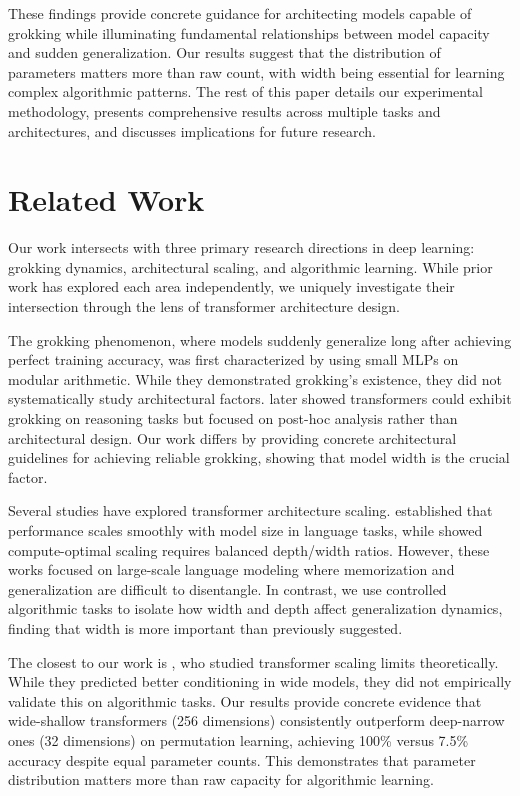 \documentclass{article} %
\begin{document}
These findings provide concrete guidance for architecting models capable of grokking while illuminating fundamental relationships between model capacity and sudden generalization. Our results suggest that the distribution of parameters matters more than raw count, with width being essential for learning complex algorithmic patterns. The rest of this paper details our experimental methodology, presents comprehensive results across multiple tasks and architectures, and discusses implications for future research.

\section{Related Work}
\label{sec:related}
Our work intersects with three primary research directions in deep learning: grokking dynamics, architectural scaling, and algorithmic learning. While prior work has explored each area independently, we uniquely investigate their intersection through the lens of transformer architecture design.

The grokking phenomenon, where models suddenly generalize long after achieving perfect training accuracy, was first characterized by \citet{power2022grokking} using small MLPs on modular arithmetic. While they demonstrated grokking's existence, they did not systematically study architectural factors. \citet{Wang2024GrokkedTA} later showed transformers could exhibit grokking on reasoning tasks but focused on post-hoc analysis rather than architectural design. Our work differs by providing concrete architectural guidelines for achieving reliable grokking, showing that model width is the crucial factor.

Several studies have explored transformer architecture scaling. \citet{Kaplan2020ScalingLF} established that performance scales smoothly with model size in language tasks, while \citet{Hoffmann2022TrainingCL} showed compute-optimal scaling requires balanced depth/width ratios. However, these works focused on large-scale language modeling where memorization and generalization are difficult to disentangle. In contrast, we use controlled algorithmic tasks to isolate how width and depth affect generalization dynamics, finding that width is more important than previously suggested.

The closest to our work is \citet{Noci2023TheST}, who studied transformer scaling limits theoretically. While they predicted better conditioning in wide models, they did not empirically validate this on algorithmic tasks. Our results provide concrete evidence that wide-shallow transformers (256 dimensions) consistently outperform deep-narrow ones (32 dimensions) on permutation learning, achieving 100\% versus 7.5\% accuracy despite equal parameter counts. This demonstrates that parameter distribution matters more than raw capacity for algorithmic learning.
\end{document}
